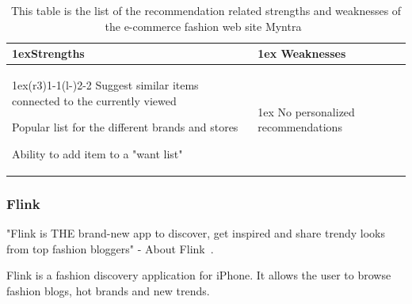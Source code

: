     \begin{table}[H]
        \centering
        \begin{tabularx}{\linewidth}{>{\parskip1ex}X@{\kern4\tabcolsep}>{\parskip1ex}X}
            \toprule
            \hfil\bfseries Strengths
            &
            \hfil\bfseries Weaknesses
            \\\cmidrule(r{3\tabcolsep}){1-1}\cmidrule(l{-\tabcolsep}){2-2}
	        Suggest similar items connected to the currently viewed \par
            Popular list for the different brands and stores \par
            Ability to add item to a "want list"\par
            &
            No personalized recommendations \par
            \\\bottomrule
        \end{tabularx}
        \caption[Recommendation related strengths and weaknesses of Myntra~\cite{myntra}]{This table is the list of the recommendation related strengths and weaknesses of the e-commerce fashion web site Myntra~\cite{myntra}}
        \label{table:ecommerceMyntra}
    \end{table}

\subsubsection{Flink} %
\label{par:flink}
    "Flink is THE brand-new app to discover, get inspired and share trendy looks from top fashion bloggers" - About Flink~\cite{flink}.

    Flink is a fashion discovery application for iPhone.
    It allows the user to browse fashion blogs, hot brands and new trends.

